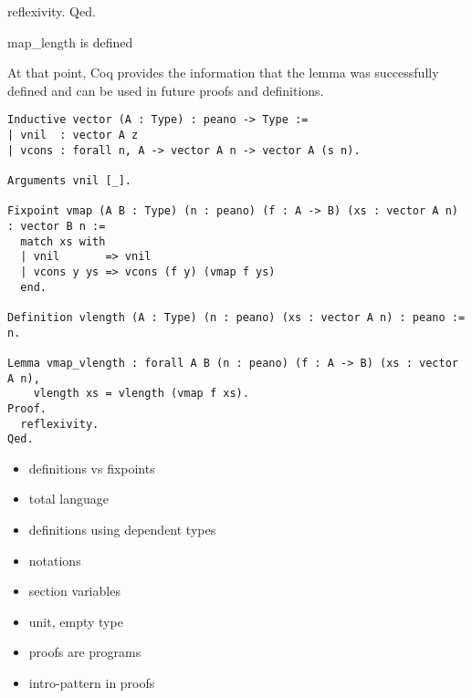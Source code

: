 \begin{cproof}
\begin{miniMinted}
    reflexivity.
Qed.
\end{miniMinted}
\begin{miniVerb}
map_length is defined
\end{miniVerb}
\end{cproof}

At that point, Coq provides the information that the lemma  was successfully defined and can be used in future proofs and definitions.

\begin{verbatim}
Inductive vector (A : Type) : peano -> Type :=
| vnil  : vector A z
| vcons : forall n, A -> vector A n -> vector A (s n).

Arguments vnil [_].

Fixpoint vmap (A B : Type) (n : peano) (f : A -> B) (xs : vector A n) : vector B n :=
  match xs with
  | vnil       => vnil
  | vcons y ys => vcons (f y) (vmap f ys)
  end.

Definition vlength (A : Type) (n : peano) (xs : vector A n) : peano := n.

Lemma vmap_vlength : forall A B (n : peano) (f : A -> B) (xs : vector A n),
    vlength xs = vlength (vmap f xs).
Proof.
  reflexivity.
Qed.
\end{verbatim}

%
%

\begin{itemize}

\item definitions vs fixpoints
\item total language
\item definitions using dependent types
\item notations
\item section variables
\item unit, empty type
\item proofs are programs
\item intro-pattern in proofs

\end{itemize}
